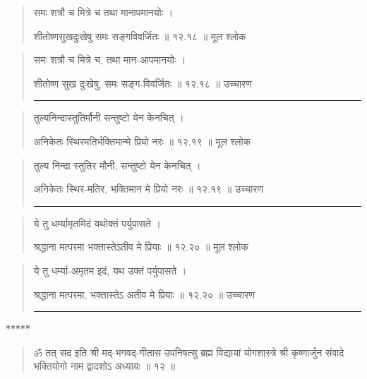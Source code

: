 \begin{quotation} 

समः शत्रौ च मित्रे च तथा मानापमानयोः ।  

शीतोष्णसुखदुःखेषु समः सङ्‍गविवर्जितः  ॥ १२.१८ ॥  मूल श्लोक
\end{quotation}

\begin{quotation}

समः शत्रौ च मित्रे च, तथा मान-आपमानयोः ।  

शीतोष्ण सुख दुःखेषु, समः सङ्‍ग-विवर्जितः  ॥ १२.१८ ॥  उच्चारण

\noindent\rule{16cm}{0.4pt} 
\end{quotation}


\begin{quotation} 

तुल्यनिन्दास्तुतिर्मौनी सन्तुष्टो येन केनचित्‌ ।  

अनिकेतः स्थिरमतिर्भक्तिमान्मे प्रियो नरः  ॥ १२.१९ ॥  मूल श्लोक
\end{quotation}

\begin{quotation}

तुल्य निन्दा स्तुतिर मौनी, सन्तुष्टो येन केनचित्‌ ।  

अनिकेतः स्थिर-मतिर, भक्तिमान मे प्रियो नरः  ॥ १२.१९ ॥  उच्चारण

\noindent\rule{16cm}{0.4pt} 
\end{quotation}


\begin{quotation} 

ये तु धर्म्यामृतमिदं यथोक्तं पर्युपासते ।  

श्रद्धाना मत्परमा भक्तास्तेऽतीव मे प्रियाः  ॥ १२.२० ॥  मूल श्लोक
\end{quotation}

\begin{quotation}

ये तु धर्म्या-अमृतम इदं, यथ उक्तं पर्युपासते ।  

श्रद्धाना मत्परमा, भक्तास्तेऽ अतीव मे प्रियाः  ॥ १२.२० ॥  उच्चारण

\noindent\rule{16cm}{0.4pt} 
\end{quotation}

\begin{center} ***** \end{center}
\begin{quotation} 


ॐ तत् सद इति श्री मद्-भगवद्-गीतास उपनिषत्सु ब्रह्म विद्यायां योगशास्त्रे श्री कृष्णार्जुन संवादे भक्तियोगो नाम द्वादशोऽ अध्यायः  ॥  १२  ॥ 
\end{quotation} 